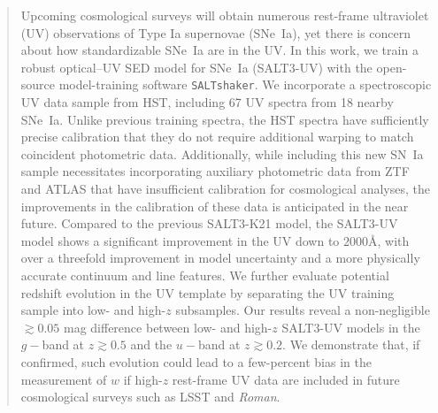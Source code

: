 \documentclass[twocolumn,tighten,times,floatfix]{aastex631}
\newcommand{\saltshaker}{\texttt{SALTshaker}}
\begin{document}
\begin{abstract}

Upcoming cosmological surveys will obtain numerous rest-frame ultraviolet (UV) observations of Type Ia supernovae (SNe~Ia), yet there is concern about how standardizable SNe~Ia are in the UV. 
In this work, we train a robust optical--UV SED model for SNe~Ia (SALT3-UV) with the open-source model-training software \saltshaker. We incorporate a spectroscopic UV data sample from HST, including 67 UV spectra from 18 nearby SNe~Ia. Unlike previous training spectra, the HST spectra have sufficiently precise calibration that they do not require additional warping to match coincident photometric data.  Additionally, while including this new SN~Ia sample necessitates incorporating auxiliary photometric data from ZTF and ATLAS that have insufficient calibration for cosmological analyses, the improvements in the calibration of these data is anticipated in the near future.
Compared to the previous SALT3-K21 model, the SALT3-UV model shows a significant improvement  in the UV down to $2000$\AA, with over a threefold improvement in model uncertainty and a more physically accurate continuum and line features. We further evaluate potential redshift evolution in the UV template by separating the UV training sample into low- and high-$z$ subsamples. Our results reveal a non-negligible $\gtrsim 0.05$ mag difference between low- and high-$z$ SALT3-UV models in the $g-$band at $z\gtrsim0.5$ and the $u-$band at $z\gtrsim0.2$. We demonstrate that, if confirmed, such evolution could lead to a few-percent bias in the measurement of $w$ if high-$z$ rest-frame UV data are included in future cosmological surveys such as LSST and \textit{Roman}.

\end{abstract}

\end{document}
